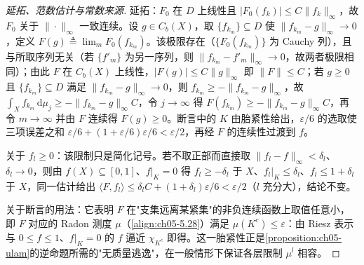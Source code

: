 \documentclass[../../main.tex]{subfiles}%
\begin{document}
\begin{proof}[延拓、范数估计与常数来源]
延拓：$F_0$ 在 $D$ 上线性且 $|F_0(f_k)|\leqslant C\|f_k\|_\infty$，故 $F_0$ 关于 $\|\cdot\|_\infty$ 一致连续。设 $g\in C_b(X)$，取 $\{f_{k_m}\}\subseteq D$ 使 $\|f_{k_m}-g\|_\infty\to0$，定义 $F(g)\triangleq\lim_mF_0(f_{k_m})$。该极限存在（$\{F_0(f_{k_m})\}$ 为 Cauchy 列），且与所取序列无关（若 $\{f'_{m}\}$ 为另一序列，则 $\|f_{k_m}-f'_m\|_\infty\to0$，故两者极限相同）；由此 $F$ 在 $C_b(X)$ 上线性，$|F(g)|\leqslant C\|g\|_\infty$ 即 $\|F\|\leqslant C$；若 $g\geqslant0$ 且 $\{f_{k_m}\}\subseteq D$ 满足 $\|f_{k_m}-g\|_\infty\to0$，则 $f_{k_m}\geqslant-\|f_{k_m}-g\|_\infty$，故 $\int_Xf_{k_m}\,\mathrm{d}\mu_j\geqslant-\|f_{k_m}-g\|_\infty C$，令 $j\to\infty$ 得 $F(f_{k_m})\geqslant-\|f_{k_m}-g\|_\infty C$，再令 $m\to\infty$ 并由 $F$ 连续得 $F(g)\geqslant0$。断言中的 $K$ 由胎紧性给出，$\varepsilon/6$ 的选取使三项误差之和 $\varepsilon/6+(1+\varepsilon/6)\varepsilon/6<\varepsilon/2$，再经 $F$ 的连续性过渡到 $f$。

关于 $f_l\geqslant0$：该限制只是简化记号。若不取正部而直接取 $\|f_l-f\|_\infty<\delta_l$、$\delta_l\to0$，则由 $f(X)\subseteq[0,1]$、$f|_K=0$ 得 $f_l\geqslant-\delta_l$ 于 $X$、$f_l|_K\leqslant\delta_l$、$f_l\leqslant1+\delta_l$ 于 $X$，同一估计给出 $\langle F,f_l\rangle\leqslant\delta_l C+(1+\delta_l)\varepsilon/6<\varepsilon/2$（$l$ 充分大），结论不变。

关于断言的用法：它表明 $F$ 在"支集远离某紧集"的非负连续函数上取值任意小，即 $F$ 对应的 Radon 测度 $\mu$（\eqref{align:ch05-5.28}）满足 $\mu(K^c)\leqslant\varepsilon$：由 Riesz 表示与 $0\leqslant f\leqslant1$、$f|_K=0$ 的 $f$ 逼近 $\chi_{K^c}$ 即得。这一胎紧性正是\cref{proposition:ch05-ulam}的逆命题所需的"无质量逃逸"，在一般情形下保证各层限制 $\mu^l$ 相容。
\end{proof}
\end{document}
